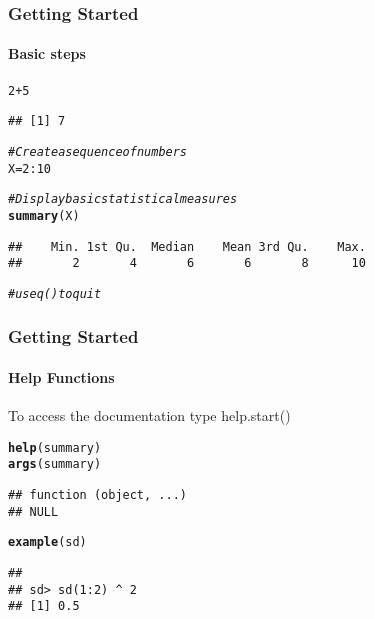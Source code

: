 \documentclass[12pt]{beamer}\usepackage[]{graphicx}\usepackage[]{color}
\makeatletter
\newcommand{\hlnum}[1]{\textcolor[rgb]{0.686,0.059,0.569}{#1}}%
\newcommand{\hlcom}[1]{\textcolor[rgb]{0.678,0.584,0.686}{\textit{#1}}}%
\newcommand{\hlopt}[1]{\textcolor[rgb]{0,0,0}{#1}}%
\newcommand{\hlstd}[1]{\textcolor[rgb]{0.345,0.345,0.345}{#1}}%
\newcommand{\hlkwb}[1]{\textcolor[rgb]{0.69,0.353,0.396}{#1}}%
\newcommand{\hlkwd}[1]{\textcolor[rgb]{0.737,0.353,0.396}{\textbf{#1}}}%
\newenvironment{kframe}{%
 \def\at@end@of@kframe{}%
 \ifinner\ifhmode%
  \def\at@end@of@kframe{\end{minipage}}%
  \begin{minipage}{\columnwidth}%
 \fi\fi%
 \def\FrameCommand##1{\hskip\@totalleftmargin \hskip-\fboxsep
 \colorbox{shadecolor}{##1}\hskip-\fboxsep
     \hskip-\linewidth \hskip-\@totalleftmargin \hskip\columnwidth}%
 \MakeFramed {\advance\hsize-\width
   \@totalleftmargin\z@ \linewidth\hsize
   \@setminipage}}%
 {\par\unskip\endMakeFramed%
 \at@end@of@kframe}
\newenvironment{knitrout}{}{} %
\makeatother
\begin{document}
\begin{frame}
  \frametitle{Getting Started}
  \framesubtitle{Basic steps}

\begin{knitrout}
\color{fgcolor}\begin{kframe}
\begin{alltt}
\hlnum{2}\hlopt{+}\hlnum{5}
\end{alltt}
\begin{verbatim}
## [1] 7
\end{verbatim}
\begin{alltt}
\hlcom{# Create a sequence of numbers}
\hlstd{X} \hlkwb{=} \hlnum{2}\hlopt{:}\hlnum{10}

\hlcom{# Display basic statistical measures}
\hlkwd{summary}\hlstd{(X)}
\end{alltt}
\begin{verbatim}
##    Min. 1st Qu.  Median    Mean 3rd Qu.    Max. 
##       2       4       6       6       8      10
\end{verbatim}
\begin{alltt}
\hlcom{# use q() to quit}
\end{alltt}
\end{kframe}
\end{knitrout}
\clearpage
\end{frame}

\begin{frame}
  \frametitle{Getting Started}
  \framesubtitle{Help Functions}
\begin{block}{To access the documentation type}
help.start()
\end{block}
\begin{knitrout}
\color{fgcolor}\begin{kframe}
\begin{alltt}
\hlkwd{help}\hlstd{(summary)}
\hlkwd{args}\hlstd{(summary)}
\end{alltt}
\begin{verbatim}
## function (object, ...) 
## NULL
\end{verbatim}
\begin{alltt}
\hlkwd{example}\hlstd{(sd)}
\end{alltt}
\begin{verbatim}
## 
## sd> sd(1:2) ^ 2
## [1] 0.5
\end{verbatim}
\end{kframe}
\end{knitrout}
\clearpage
\end{frame}
\end{document}
